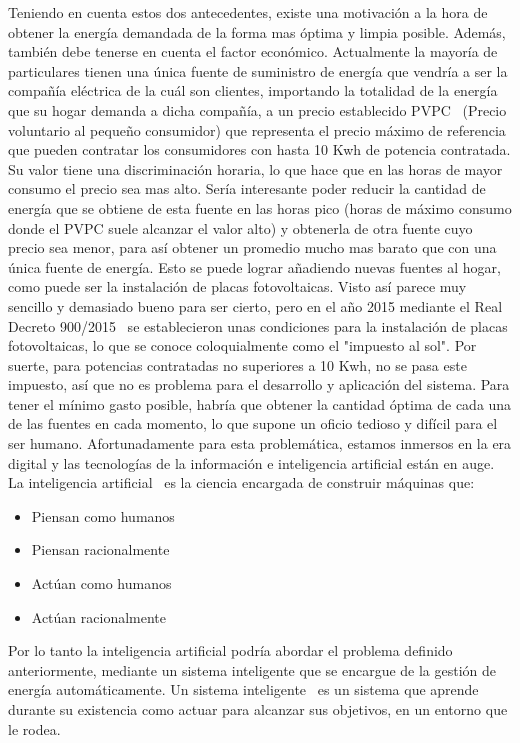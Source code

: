 Teniendo en cuenta estos dos antecedentes, existe una motivación a la hora de obtener la energía demandada de la forma mas óptima y limpia posible. Además, también debe tenerse en cuenta el factor económico. Actualmente la mayoría de particulares tienen una única fuente de suministro de energía que vendría a ser la compañía eléctrica de la cuál son clientes, importando la totalidad de la energía que su hogar demanda a dicha compañía, a un precio establecido PVPC~\cite{Ree14} (Precio voluntario al pequeño consumidor) que representa el precio máximo de referencia que pueden contratar los consumidores con hasta 10 Kwh de potencia contratada. Su valor tiene una discriminación horaria, lo que hace que en las horas de mayor consumo el precio sea mas alto. Sería interesante poder reducir la cantidad de energía que se obtiene de esta fuente en las horas pico (horas de máximo consumo donde el PVPC suele alcanzar el valor alto) y obtenerla de otra fuente cuyo precio sea menor, para así obtener un promedio mucho mas barato que con una única fuente de energía. Esto se puede lograr añadiendo nuevas fuentes al hogar, como puede ser la instalación de placas fotovoltaicas. Visto así parece muy sencillo y demasiado bueno para ser cierto, pero en el año 2015 mediante el Real Decreto 900/2015~\cite{Boe15} se establecieron unas condiciones para la instalación de placas fotovoltaicas, lo que se conoce coloquialmente como el "impuesto al sol". Por suerte, para potencias contratadas no superiores a 10 Kwh, no se pasa este impuesto, así que no es problema para el desarrollo y aplicación del sistema. Para tener el mínimo gasto posible, habría que obtener la cantidad óptima de cada una de las fuentes en cada momento, lo que supone un oficio tedioso y difícil para el ser humano. Afortunadamente para esta problemática, estamos inmersos en la era digital y las tecnologías de la información e inteligencia artificial están en auge. La inteligencia artificial~\cite{Russ06} es la ciencia encargada de construir máquinas que:
\begin{itemize}
	\item Piensan como humanos
	\item Piensan racionalmente
	\item Actúan como humanos
	\item Actúan racionalmente
\end{itemize}
Por lo tanto la inteligencia artificial podría abordar el problema definido anteriormente, mediante un sistema inteligente que se encargue de la gestión de energía automáticamente. Un sistema inteligente~\cite{Russ06} es un sistema que aprende durante su existencia como actuar para alcanzar sus objetivos, en un entorno que le rodea.\\

